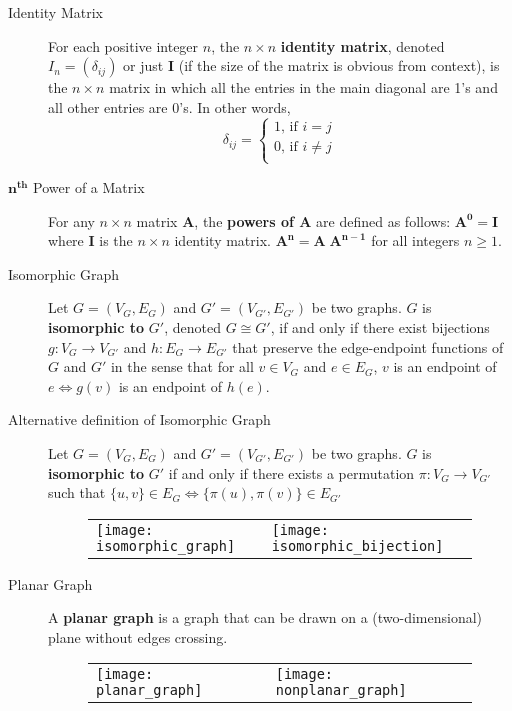 \documentclass{article}
\begin{document}
\begin{description}
	\item[Identity Matrix]For each positive integer $n$, the $n\times n$ \textbf{identity matrix}, denoted $I_{n} = (\delta_{ij})$ or just \textbf{I} (if the size of the matrix is obvious from context), is the $n\times n$ matrix in which all the entries in the main
diagonal are 1’s and all other entries are 0’s. In other words, 
	\[ 
		\delta_{ij}=
		\begin{cases}
			\text{1, if $i=j$} \\
			\text{0, if $i\neq j$} \\
		\end{cases}
	\]
    \item[$\mathbf{n^{th}}$ Power of a Matrix] For any $n \times n$ matrix \textbf{A}, the \textbf{powers of A} are defined as follows: $\mathbf{A^{0}}=\mathbf{I}$ where \textbf{I} is the $n \times n$ identity matrix. $\mathbf{A^{n}}=\mathbf{A\;A^{n-1}}$ for all integers $n\geq 1$.
    \item[Isomorphic Graph] Let $G=(V_{G}, E_{G})$ and $G'=(V_{G'}, E_{G'})$ be two graphs. $G$ is \textbf{isomorphic to} $G'$, denoted $G\cong G'$, if and only if there exist bijections $g:V_{G}\to V_{G'}$ and $h:E_{G}\to E_{G'}$ that preserve the edge-endpoint functions of $G$ and $G'$ in the sense that for all $v\in V_{G}$ and $e\in E_{G}$, $v$ is an endpoint of $e\Leftrightarrow g(v)$ is an endpoint of $h(e)$.
    \item[ Alternative definition of Isomorphic Graph] Let $G=(V_{G}, E_{G})$ and $G'=(V_{G'}, E_{G'})$ be two graphs. $G$ is \textbf{isomorphic to} $G'$ if and only if there exists a permutation $\pi:V_{G}\to V_{G'}$ such that $\{u,v\}\in E_{G}\Leftrightarrow \{\pi(u),\pi(v)\}\in E_{G'}$
    
    \begin{figure}[H]
		\centering
		\begin{tabular}{ll}
			\texttt{[image: isomorphic\_graph]} &
			\texttt{[image: isomorphic\_bijection]}
		\end{tabular}
	\end{figure}
    
    \item[Planar Graph] A \textbf{planar graph} is a graph that can be drawn on a (two-dimensional) plane without edges crossing.
    
    \begin{figure}[H]
		\centering
		\begin{tabular}{ll}
			\texttt{[image: planar\_graph]} &
			\texttt{[image: nonplanar\_graph]}
		\end{tabular}
	\end{figure}
	

\end{description}
\end{document}
